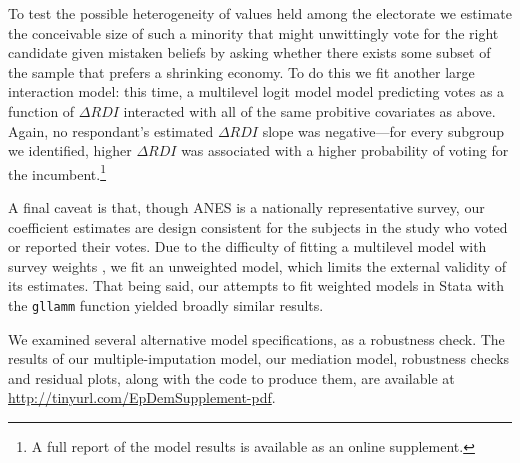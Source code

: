 \documentclass[11pt]{article}
\begin{document}
To test the possible heterogeneity of values held among the electorate we estimate the conceivable size of such a minority that might unwittingly vote for the right candidate given mistaken beliefs by asking whether there exists some subset of the sample that prefers a shrinking economy. %
To do this we fit another large interaction model: this time, a
multilevel logit model model predicting votes as a function of $\Delta
RDI$ interacted with all of the same probitive covariates as above.
Again, no respondant's estimated $\Delta RDI$ slope was negative---for
every subgroup we identified, higher $\Delta RDI$ was associated with
a higher probability of voting for the incumbent.\footnote{A full report of the model results is available as an online supplement.}

\begin{comment}
Though we argue that RDI's lack of significance when prospective and retrospective variables are included in the model is not a problem, we must admit that this informal path analysis \citep{baron1986moderator} should be taken with a grain of salt.
In particular; \citet{imai2010identification} has shown that the path analysis estimators of indirect and direct effects rely upon sequential ignorability.
Among other things, this implies that, conditioning on the other variables in the model, the relationship between subjects' perceptions of the economy and their votes are unconfounded.
This would be violated if, say, a different macroeconomic indicator, such as unemployment, predicted both subjects' perceptions of the economy and RDI.
Nevertheless, it is hard to see how RDI would affect voters' choices other than by affecting their perceptions of the macroeconomy, and these results support that intuition.
\end{comment}

A final caveat is that, though ANES is a nationally representative survey, our coefficient estimates are design consistent for the subjects in the study who voted or reported their votes.
Due to the difficulty of fitting a multilevel model with survey weights \citep{gelman2007struggles}, we fit an unweighted model, which limits the external validity of its estimates.
That being said, our attempts to fit weighted models in Stata \citep{stata} with the \verb|gllamm| function \citep{gllamm} yielded broadly similar results.

We examined several alternative model specifications, as a robustness check.
The results of %
our multiple-imputation model, our mediation model, robustness checks and residual plots, along with the code to produce them, are available at \url{http://tinyurl.com/EpDemSupplement-pdf}.
\end{document}
